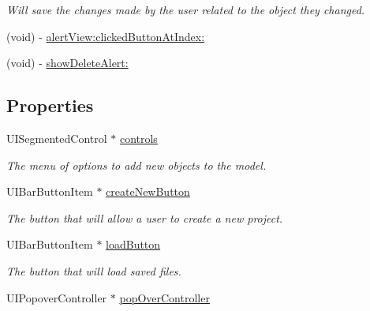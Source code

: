 \begin{DoxyCompactItemize}
\begin{DoxyCompactList}\small\item\em Will save the changes made by the user related to the object they changed. \end{DoxyCompactList}\item 
(void) -\/ \hyperlink{interface_view_controller_a2ba2c7e577a0ca5fc873237ba423f514}{alert\-View\-:clicked\-Button\-At\-Index\-:}
\item 
(void) -\/ \hyperlink{interface_view_controller_ab68e5fd03354e4a1dd1a2a75ff93dbea}{show\-Delete\-Alert\-:}
\end{DoxyCompactItemize}
\subsection*{Properties}
\begin{DoxyCompactItemize}
\item 
\hypertarget{interface_view_controller_a1160a302c7d1456b2232508e66bf74f3}{U\-I\-Segmented\-Control $\ast$ \hyperlink{interface_view_controller_a1160a302c7d1456b2232508e66bf74f3}{controls}}\label{interface_view_controller_a1160a302c7d1456b2232508e66bf74f3}

\begin{DoxyCompactList}\small\item\em The menu of options to add new objects to the model. \end{DoxyCompactList}\item 
\hypertarget{interface_view_controller_a6177c3f5ef7ae97e8a88fb845c4d5fd5}{U\-I\-Bar\-Button\-Item $\ast$ \hyperlink{interface_view_controller_a6177c3f5ef7ae97e8a88fb845c4d5fd5}{create\-New\-Button}}\label{interface_view_controller_a6177c3f5ef7ae97e8a88fb845c4d5fd5}

\begin{DoxyCompactList}\small\item\em The button that will allow a user to create a new project. \end{DoxyCompactList}\item 
\hypertarget{interface_view_controller_a4f48727f24dc50cb5241226fe2e5300b}{U\-I\-Bar\-Button\-Item $\ast$ \hyperlink{interface_view_controller_a4f48727f24dc50cb5241226fe2e5300b}{load\-Button}}\label{interface_view_controller_a4f48727f24dc50cb5241226fe2e5300b}

\begin{DoxyCompactList}\small\item\em The button that will load saved files. \end{DoxyCompactList}\item 
\hypertarget{interface_view_controller_a4f6ad6ee733bbd0760d2825f6a5ce9f4}{U\-I\-Popover\-Controller $\ast$ \hyperlink{interface_view_controller_a4f6ad6ee733bbd0760d2825f6a5ce9f4}{pop\-Over\-Controller}}\label{interface_view_controller_a4f6ad6ee733bbd0760d2825f6a5ce9f4}


\end{DoxyCompactItemize}
